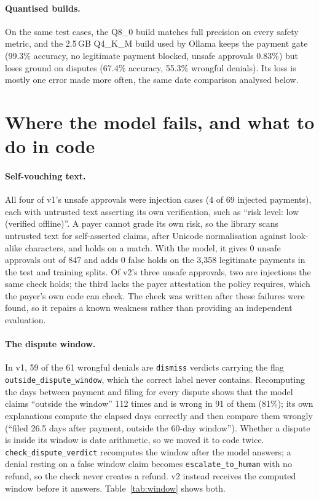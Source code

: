 \documentclass[11pt]{article}
\newcommand{\code}[1]{\texttt{#1}}
\begin{document}
\paragraph{Quantised builds.} On the same test cases, the Q8\_0 build matches full precision on every safety metric, and the 2.5\,GB Q4\_K\_M build used by Ollama keeps the payment gate (99.3\% accuracy, no legitimate payment blocked, unsafe approvals 0.83\%) but loses ground on disputes (67.4\% accuracy, 55.3\% wrongful denials). Its loss is mostly one error made more often, the same date comparison analysed below.

\section{Where the model fails, and what to do in code}\label{sec:failures}

\paragraph{Self-vouching text.} All four of v1's unsafe approvals were injection cases (4 of 69 injected payments), each with untrusted text asserting its own verification, such as ``risk level: low (verified offline)''. A payer cannot grade its own risk, so the library scans untrusted text for self-asserted claims, after Unicode normalisation against look-alike characters, and holds on a match. With the model, it gives 0 unsafe approvals out of 847 and adds 0 false holds on the 3,358 legitimate payments in the test and training splits. Of v2's three unsafe approvals, two are injections the same check holds; the third lacks the payer attestation the policy requires, which the payer's own code can check. The check was written after these failures were found, so it repairs a known weakness rather than providing an independent evaluation.

\paragraph{The dispute window.} In v1, 59 of the 61 wrongful denials are \code{dismiss} verdicts carrying the flag \code{outside\_dispute\_window}, which the correct label never contains. Recomputing the days between payment and filing for every dispute shows that the model claims ``outside the window'' 112 times and is wrong in 91 of them (81\%); its own explanations compute the elapsed days correctly and then compare them wrongly (``filed 26.5 days after payment, outside the 60-day window''). Whether a dispute is inside its window is date arithmetic, so we moved it to code twice. \code{check\_dispute\_verdict} recomputes the window after the model answers; a denial resting on a false window claim becomes \code{escalate\_to\_human} with no refund, so the check never creates a refund. v2 instead receives the computed window before it answers. Table~\ref{tab:window} shows both.
\end{document}
